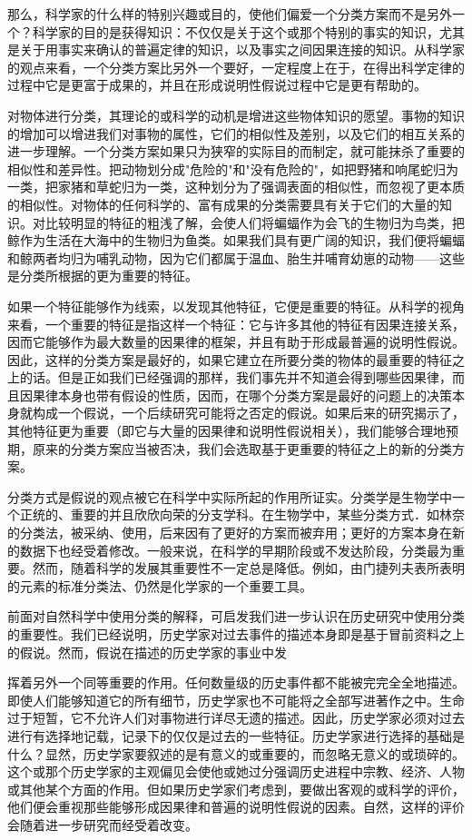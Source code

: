 那么，科学家的什么样的特别兴趣或目的，使他们偏爱一个分类方案而不是另外一个？科学家的目的是获得知识：不仅仅是关于这个或那个特别的事实的知识，尤其是关于用事实来确认的普遍定律的知识，以及事实之间因果连接的知识。从科学家的观点来看，一个分类方案比另外一个要好，一定程度上在于，在得出科学定律的过程中它是更富于成果的，并且在形成说明性假说过程中它是更有帮助的。

对物体进行分类，其理论的或科学的动机是增进这些物体知识的愿望。事物的知识的增加可以增进我们对事物的属性，它们的相似性及差别，以及它们的相互关系的进一步理解。一个分类方案如果只为狭窄的实际目的而制定，就可能抹杀了重要的相似性和差异性。把动物划分成"危险的"和"没有危险的"，如把野猪和响尾蛇归为一类，把家猪和草蛇归为一类，这种划分为了强调表面的相似性，而忽视了更本质的相似性。对物体的任何科学的、富有成果的分类需要具有关于它们的大量的知识。对比较明显的特征的粗浅了解，会使人们将蝙蝠作为会飞的生物归为鸟类，把鲸作为生活在大海中的生物归为鱼类。如果我们具有更广阔的知识，我们便将蝙蝠和鲸两者均归为哺乳动物，因为它们都属于温血、胎生并哺育幼崽的动物——这些是分类所根据的更为重要的特征。

如果一个特征能够作为线索，以发现其他特征，它便是重要的特征。从科学的视角来看，一个重要的特征是指这样一个特征：它与许多其他的特征有因果连接关系，因而它能够作为最大数量的因果律的框架，并且有助于形成最普遍的说明性假说。因此，这样的分类方案是最好的，如果它建立在所要分类的物体的最重要的特征之上的话。但是正如我们已经强调的那样，我们事先并不知道会得到哪些因果律，而且因果律本身也带有假设的性质，因而，在哪个分类方案是最好的问题上的决策本身就构成一个假说，一个后续研究可能将之否定的假说。如果后来的研究揭示了，其他特征更为重要（即它与大量的因果律和说明性假说相关），我们能够合理地预期，原来的分类方案应当被否决，我们会选取基于更重要的特征之上的新的分类方案。

分类方式是假说的观点被它在科学中实际所起的作用所证实。分类学是生物学中一个正统的、重要的并且欣欣向荣的分支学科。在生物学中，某些分类方式．如林奈的分类法，被采纳、使用，后来因有了更好的方案而被弃用；更好的方案本身在新的数据下也经受着修改。一般来说，在科学的早期阶段或不发达阶段，分类最为重要。然而，随着科学的发展其重要性不一定总是降低。例如，由门捷列夫表所表明的元素的标准分类法、仍然是化学家的一个重要工具。

前面对自然科学中使用分类的解释，可启发我们进一步认识在历史研究中使用分类的重要性。我们已经说明，历史学家对过去事件的描述本身即是基于冒前资料之上的假说。然而，假说在描述的历史学家的事业中发

挥着另外一个同等重要的作用。任何数量级的历史事件都不能被完完全全地描述。即使人们能够知道它的所有细节，历史学家也不可能将之全部写进著作之中。生命过于短暂，它不允许人们对事物进行详尽无遗的描述。因此，历史学家必须对过去进行有选择地记载，记录下的仅仅是过去的一些特征。历史学家进行选择的基础是什么？显然，历史学家要叙述的是有意义的或重要的，而忽略无意义的或琐碎的。这个或那个历史学家的主观偏见会使他或她过分强调历史进程中宗教、经济、人物或其他某个方面的作用。但如果历史学家们考虑到，要做出客观的或科学的评价，他们便会重视那些能够形成因果律和普遍的说明性假说的因素。自然，这样的评价会随着进一步研究而经受着改变。

